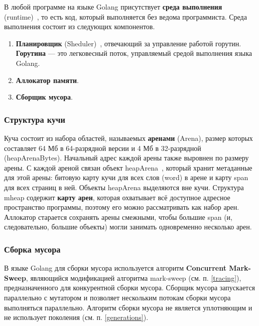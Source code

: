 В любой программе на языке Golang присутствует \textbf{среда выполнения} (runtime)~\cite{golang_runtime}, то есть код, который выполняется без ведома программиста. Среда выполнения состоит из следующих компонентов.

\begin{enumerate}[label*=\arabic*.]
	\item \textbf{Планировщик} (Sheduler)~\cite{golang_scheduler}, отвечающий за управление работой горутин. \textbf{Горутина} --- это легковесный поток, управляемый средой выполнения языка Golang.~\cite{golang_goroutine}
	\item \textbf{Аллокатор памяти}.
	\item \textbf{Сборщик мусора}.
\end{enumerate}

\subsubsection{Структура кучи}

Куча состоит из набора областей, называемых \textbf{аренами} (Arena), размер которых составляет 64 Мб в 64-разрядной версии и 4 Мб в 32-разрядной (heapArenaBytes). Начальный адрес каждой арены также выровнен по размеру арены.  С каждой ареной связан объект heapArena~\cite{golang_mheap}, который хранит метаданные для этой арены: битовую карту кучи для всех слов (word) в арене и карту span для всех страниц в ней. Объекты heapArena выделяются вне кучи. Структура mheap содержит \textbf{карту арен}, которая охватывает всё доступное адресное пространство программы, поэтому его можно рассматривать как набор арен. Аллокатор старается сохранять арены смежными, чтобы большие span (и, следовательно, большие объекты) могли занимать одновременно несколько арен.~\cite{golang_malloc}

\subsubsection{Сборка мусора}

В языке Golang для сборки мусора используется алгоритм \textbf{Concurrent Mark-Sweep}, являющийся модификацией алгоритма mark-sweep (см. п. \ref{tracing}), предназначенного для конкурентной сборки мусора. Сборщик мусора запускается параллельно с мутатором и позволяет нескольким потокам сборки мусора выполняться параллельно. Алгоритм сборки мусора не является уплотняющим и не использует поколения (см. п. \ref{generations}).~\cite{golang_gc}

